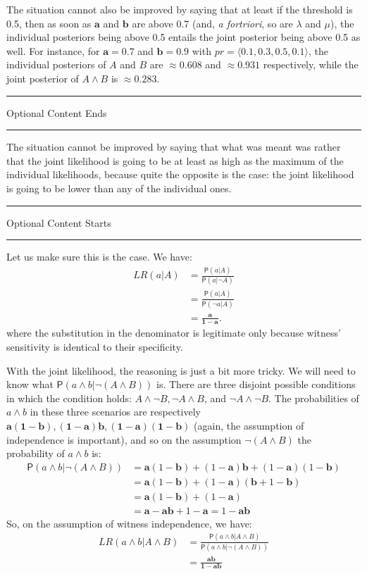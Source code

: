 \documentclass[10pt,dvipsnames,enabledeprecatedfontcommands]{scrartcl}
\newcommand{\ra}{\rangle}
\newcommand{\la}{\langle}
\newcommand{\n}{\neg}
\newcommand{\et}{\wedge}
\newcommand{\pr}[1]{\mathsf{P}(#1)}
\newcommand{\intermezzoa}{
	\begin{minipage}[c]{13cm}
	\begin{center}\rule{10cm}{0.4pt}



	\tiny{\sc Optional Content Starts}
	
	\vspace{-1mm}
	
	\rule{10cm}{0.4pt}\end{center}
	\end{minipage}\nopagebreak 
	}
\newcommand{\intermezzob}{\nopagebreak 
	\begin{minipage}[c]{13cm}
	\begin{center}\rule{10cm}{0.4pt}

	\tiny{\sc Optional Content Ends}
	
	\vspace{-1mm}
	
	\rule{10cm}{0.4pt}\end{center}
	\end{minipage}
	}
\begin{document}
The situation cannot also be improved by saying that at least if the
threshold is 0.5, then as soon as \(\mathbf{a}\) and \(\mathbf{b}\) are
above 0.7 (and, \emph{a fortriori}, so are \(\lambda\) and \(\mu\)), the
individual posteriors being above 0.5 entails the joint posterior being
above 0.5 as well. For instance, for \(\mathbf{a}=0.7\) and
\(\mathbf{b}=0.9\) with \(pr= \la 0.1, 0.3, 0.5, 0.1\ra\), the
individual posteriors of \(A\) and \(B\) are \(\approx 0.608\) and
\(\approx 0.931\) respectively, while the joint posterior of \(A\et B\)
is \(\approx 0.283\).

\intermezzob

The situation cannot be improved by saying that what was meant was
rather that the joint likelihood is going to be at least as high as the
maximum of the individual likelihoods, because quite the opposite is the
case: the joint likelihood is going to be lower than any of the
individual ones.

\intermezzoa

Let us make sure this is the case. We have: \begin{align*}
 LR(a\vert A) & = \frac{\pr{a\vert A}}{\pr{a\vert \n A}}\\
 &= \frac{\pr{a\vert A}}{\pr{\n a\vert  A}} \\
& =  \frac{\mathbf{a}}{\mathbf{1-a}}.
\end{align*} where the substitution in the denominator is legitimate
only because witness' sensitivity is identical to their specificity.

With the joint likelihood, the reasoning is just a bit more tricky. We
will need to know what \(\pr{a\et b \vert \n (A\et B)}\) is. There are
three disjoint possible conditions in which the condition holds:
\(A\et \n B, \n A \et B\), and \(\n A \et \n B\). The probabilities of
\(a\et b\) in these three scenarios are respectively
\(\mathbf{a(1-b),(1-a)b,(1-a)(1-b)}\) (again, the assumption of
independence is important), and so on the assumption \(\n(A\et B)\) the
probability of \(a\et b\) is: \begin{align*}
\pr{a\et b \vert \n (A\et B)} & = 
\mathbf{a}(1-\mathbf{b})+(1-\mathbf{a})\mathbf{b}+(1-\mathbf{a})(1-\mathbf{b})\\ 
& = 
\mathbf{a}(1-\mathbf{b})+(1-\mathbf{a})(\mathbf{b} + 1-\mathbf{b})\\
& = \mathbf{a}(1-\mathbf{b})+(1-\mathbf{a})\\
& = \mathbf{a}-\mathbf{a}\mathbf{b}+1-\mathbf{a} = 1- \mathbf{a}\mathbf{b}
\end{align*} So, on the assumption of witness independence, we have:
\begin{align*}
LR(a\et b \vert A \et B) & = \frac{\pr{a\et b \vert A \et B}}{\pr{a \et b\vert \n (A \et B)}} \\
& = \frac{\mathbf{ab}}{\mathbf{1-ab}}
\end{align*}
\end{document}
